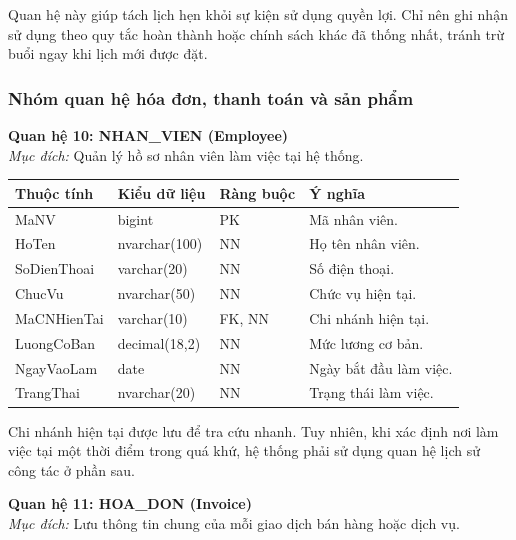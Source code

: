 \documentclass[11pt, a4paper]{article}
\begin{document}
Quan hệ này giúp tách lịch hẹn khỏi sự kiện sử dụng quyền lợi. Chỉ nên ghi nhận sử dụng theo quy tắc hoàn thành hoặc chính sách khác đã thống nhất, tránh trừ buổi ngay khi lịch mới được đặt.

\subsubsection{Nhóm quan hệ hóa đơn, thanh toán và sản phẩm}

\textbf{Quan hệ 10: NHAN\_VIEN (Employee)} \\
\textit{Mục đích:} Quản lý hồ sơ nhân viên làm việc tại hệ thống.

\begin{small}
\begin{tabularx}{\textwidth}{| C{2.8cm} | C{2.4cm} | C{2.2cm} | Y |}
\hline
\textbf{Thuộc tính} & \textbf{Kiểu dữ liệu} & \textbf{Ràng buộc} & \textbf{Ý nghĩa} \\
\hline
MaNV & bigint & PK & Mã nhân viên. \\
\hline
HoTen & nvarchar(100) & NN & Họ tên nhân viên. \\
\hline
SoDienThoai & varchar(20) & NN & Số điện thoại. \\
\hline
ChucVu & nvarchar(50) & NN & Chức vụ hiện tại. \\
\hline
MaCNHienTai & varchar(10) & FK, NN & Chi nhánh hiện tại. \\
\hline
LuongCoBan & decimal(18,2) & NN & Mức lương cơ bản. \\
\hline
NgayVaoLam & date & NN & Ngày bắt đầu làm việc. \\
\hline
TrangThai & nvarchar(20) & NN & Trạng thái làm việc. \\
\hline
\end{tabularx}
\end{small}

Chi nhánh hiện tại được lưu để tra cứu nhanh. Tuy nhiên, khi xác định nơi làm việc tại một thời điểm trong quá khứ, hệ thống phải sử dụng quan hệ lịch sử công tác ở phần sau.

\vspace{0.8em}
\textbf{Quan hệ 11: HOA\_DON (Invoice)} \\
\textit{Mục đích:} Lưu thông tin chung của mỗi giao dịch bán hàng hoặc dịch vụ.
\end{document}
